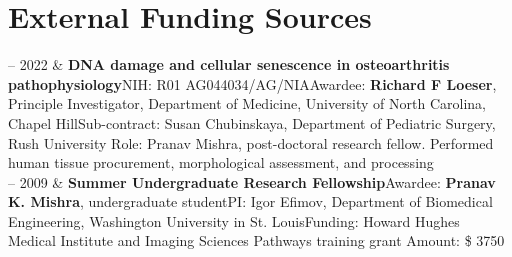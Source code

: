 \documentclass[10pt, letterpaper]{article}
\newcommand{\WASHU}{Washington University in St. Louis}
\newcommand{\RUSH}{Rush University}
\newcommand{\RUPEDS}{Department of Pediatric Surgery}
\newcommand{\Duration}[2]{\fontsize{9pt}{0}\selectfont #1 -- #2}
\newcommand{\Appointment}[4]{\textbf{#1}\newline  #2\newline  #3\newline  #4}
\begin{document}
\section{External Funding Sources}
\begin{EntriesTable}
  \Duration{2021}{2022}  &
  \Appointment{DNA damage and cellular senescence in osteoarthritis pathophysiology}
  {NIH: R01 AG044034/AG/NIA}
  {Awardee: \textbf{Richard F Loeser}, Principle Investigator, Department of Medicine, University of North Carolina, Chapel Hill}
  {Sub-contract: Susan Chubinskaya, {\RUPEDS}, {\RUSH} \newline
  {Role: Pranav Mishra, post-doctoral research fellow. Performed human tissue procurement, morphological assessment, and processing}}
  \\
  \Duration{2009}{2009}  &
  \Appointment{Summer Undergraduate Research Fellowship}
  {Awardee: \textbf{Pranav K. Mishra}, undergraduate student}
  {PI: Igor Efimov, Department of Biomedical Engineering, {\WASHU}}
  {Funding: Howard Hughes Medical Institute and Imaging Sciences Pathways training grant \newline
  Amount: \$ 3750}

\end{EntriesTable}



\end{document}
